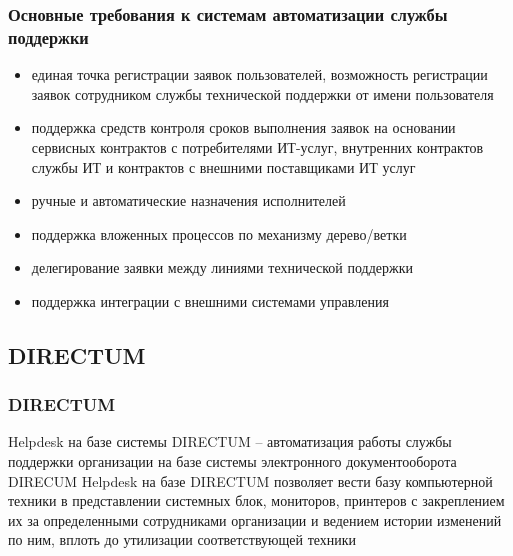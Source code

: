 \documentclass{../industrial-development}
\begin{document}
\begin{frame} \frametitle{Основные требования к системам автоматизации службы поддержки}
	\begin{itemize} 
		\item единая точка регистрации заявок пользователей, возможность регистрации заявок сотрудником службы технической поддержки от имени пользователя
		\item поддержка средств контроля сроков выполнения заявок на основании сервисных контрактов с потребителями ИТ-услуг, внутренних контрактов службы ИТ и контрактов с внешними поставщиками ИТ услуг
		\item ручные и автоматические назначения исполнителей
		\item поддержка вложенных процессов по механизму дерево/ветки
		\item делегирование заявки между линиями технической поддержки
		\item поддержка интеграции с внешними системами управления
	\end{itemize}
\end{frame}
\lecturenotes


\subsection{DIRECTUM}
\begin{frame} \frametitle{DIRECTUM}

    Helpdesk на базе системы DIRECTUM – автоматизация работы службы поддержки организации на базе системы электронного документооборота DIRECUM
    \newline
    \newline
    Helpdesk на базе DIRECTUM позволяет вести базу компьютерной техники в представлении системных блок, мониторов, принтеров с закреплением их за определенными сотрудниками организации и ведением истории изменений по ним, вплоть до утилизации соответствующей техники

\end{frame}
\lecturenotes
\end{document}

